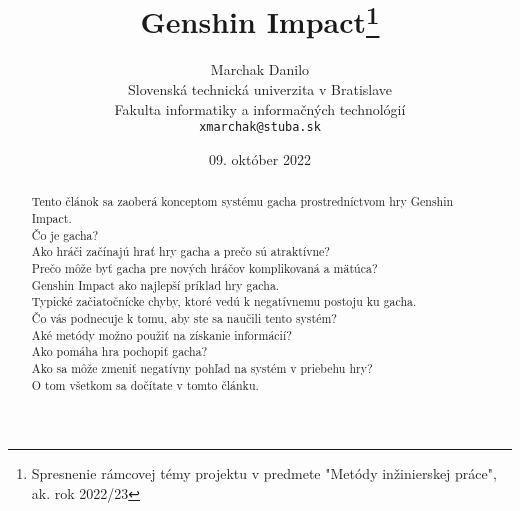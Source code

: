 \documentclass[10pt,twoside,slovak,a4paper]{article}
\title{Genshin Impact\thanks{Spresnenie rámcovej témy projektu v predmete "Metódy inžinierskej práce", ak. rok 2022/23}}
\author{Marchak Danilo\\
  {\small Slovenská technická univerzita v Bratislave}\\
  {\small Fakulta informatiky a informačných technológií}\\
  {\small \texttt{xmarchak@stuba.sk}}
}
\date{\small 09. október 2022}
\begin{document}
\maketitle

\begin{abstract}
  \begin{sloppypar}
    Tento článok sa zaoberá konceptom systému gacha prostredníctvom hry Genshin Impact.\\
    Čo je gacha?\\
    Ako hráči začínajú hrať hry gacha a prečo sú atraktívne?\\
    Prečo môže byť gacha pre nových hráčov komplikovaná a mätúca?\\
    Genshin Impact ako najlepší príklad hry gacha.\\
    Typické začiatočnícke chyby, ktoré vedú k negatívnemu postoju ku gacha.\\
    Čo vás podnecuje k tomu, aby ste sa naučili tento systém?\\
    Aké metódy možno použiť na získanie informácií?\\
    Ako pomáha hra pochopiť gacha?\\
    Ako sa môže zmeniť negatívny pohľad na systém v priebehu hry?\\
    O tom všetkom sa dočítate v tomto článku.
  \end{sloppypar}
\end{abstract}

\newpage
\nocite{*}


 
\end{document}
